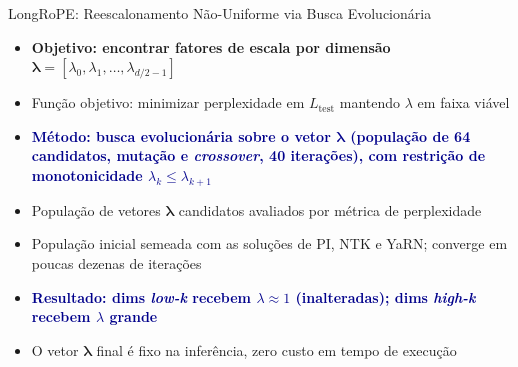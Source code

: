\documentclass[aspectratio=169, xcolor=dvipsnames]{beamer}
\begin{document}
  \begin{frame}{LongRoPE: Reescalonamento Não-Uniforme via Busca Evolucionária}
    \begin{itemize}
      \item \textbf{Objetivo: encontrar fatores de escala por dimensão} $\boldsymbol{\lambda} = [\lambda_0, \lambda_1, \ldots, \lambda_{d/2-1}]$
      \item Função objetivo: minimizar perplexidade em $L_{\text{test}}$ mantendo $\lambda$ em faixa viável
      \item \textcolor{DarkBlue}{\textbf{Método: busca evolucionária sobre o vetor $\boldsymbol{\lambda}$ (população de 64 candidatos, mutação e \textit{crossover}, 40 iterações), com restrição de monotonicidade $\lambda_k \le \lambda_{k+1}$}}
      \item População de vetores $\boldsymbol{\lambda}$ candidatos avaliados por métrica de perplexidade
      \item População inicial semeada com as soluções de PI, NTK e YaRN; converge em poucas dezenas de iterações
      \item \textcolor{DarkBlue}{\textbf{Resultado: dims \textit{low-k} recebem $\lambda \approx 1$ (inalteradas); dims \textit{high-k} recebem $\lambda$ grande}}
      \item O vetor $\boldsymbol{\lambda}$ final é fixo na inferência, zero custo em tempo de execução
    \end{itemize}
  \end{frame}
\end{document}
